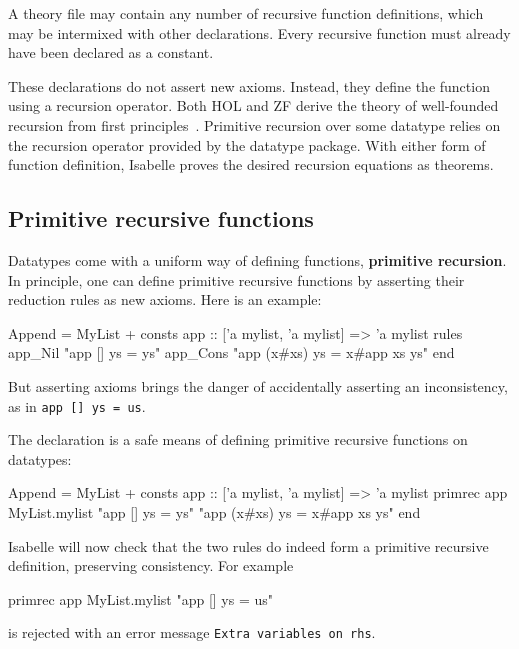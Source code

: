 A theory file may contain any number of recursive function definitions, which
may be intermixed with other declarations.  Every recursive function must
already have been declared as a constant.

These declarations do not assert new axioms.  Instead, they define the
function using a recursion operator.  Both HOL and ZF derive the theory of
well-founded recursion from first principles~\cite{paulson-set-II}.  Primitive
recursion over some datatype relies on the recursion operator provided by the
datatype package.  With either form of function definition, Isabelle proves
the desired recursion equations as theorems.


\subsection{Primitive recursive functions}
\label{sec:HOL:primrec}

Datatypes come with a uniform way of defining functions, {\bf
  primitive recursion}.  In principle, one can define
primitive recursive functions by asserting their reduction rules as
new axioms.  Here is an example:
\begin{ttbox}
Append = MyList +
consts app :: ['a mylist, 'a mylist] => 'a mylist
rules 
   app_Nil   "app [] ys = ys"
   app_Cons  "app (x#xs) ys = x#app xs ys"
end
\end{ttbox}
But asserting axioms brings the danger of accidentally asserting an
inconsistency, as in \verb$app [] ys = us$.

The  declaration is a safe means of defining primitive
recursive functions on datatypes:
\begin{ttbox}
Append = MyList +
consts app :: ['a mylist, 'a mylist] => 'a mylist
primrec app MyList.mylist
   "app [] ys = ys"
   "app (x#xs) ys = x#app xs ys"
end
\end{ttbox}
Isabelle will now check that the two rules do indeed form a primitive
recursive definition, preserving consistency.  For example
\begin{ttbox}
primrec app MyList.mylist
    "app [] ys = us"
\end{ttbox}
is rejected with an error message \texttt{Extra variables on rhs}.

\bigskip

